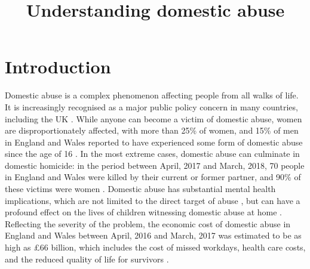 \documentclass[11pt, a4paper]{article}
\begin{document}
\title{Understanding domestic abuse}
\date{}
\maketitle

\section{Introduction}

Domestic abuse is a complex phenomenon affecting people from all walks of life. It is increasingly recognised as a major public policy concern in many countries, including the UK \cite{ep}. While anyone can become a victim of domestic abuse, women are disproportionately affected, with more than 25\% of women, and 15\% of men in England and Wales reported to have experienced some form of domestic abuse since the age of 16 \cite{ONS}. In the most extreme cases, domestic abuse can culminate in domestic homicide: in the period between April, 2017 and March, 2018, 70 people in England and Wales were killed by their current or former partner, and 90\% of these victims were women \cite{homic}. Domestic abuse has substantial mental health implications, which are not limited to the direct target of abuse \cite{ferrari}, but can have a profound effect on the lives of children witnessing domestic abuse at home \cite{callaghan}. Reflecting the severity of the problem, the economic cost of domestic abuse in England and Wales between April, 2016 and March, 2017 was estimated to be as high as \pounds 66 billion, which includes the cost of missed workdays, health care costs, and the reduced quality of life for survivors \cite{costs}.



\end{document}
